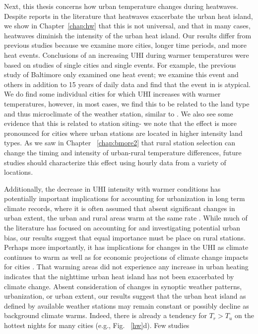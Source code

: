 Next, this thesis concerns how urban temperature changes during heatwaves. 
Despite reports in the literature that heatwaves exacerbate the urban heat island, we show in Chapter~\ref{chap:hw} that this is not universal, and that in many cases, heatwaves diminish the intensity of the urban heat island. 
Our results differ from previous studies because we examine more cities, longer time periods, and more heat events. Conclusions of an increasing UHI during warmer temperatures were based on studies of single cities and single events. For example, the previous study of Baltimore \citep{li2013synergistic} only examined one heat event; we examine this event and others in addition to 15 years of daily data and find that the event in \cite{li2013synergistic} is atypical. We do find some individual cities for which UHI increases with warmer temperatures, however, in most cases, we find this to be related to the land type and thus microclimate of the weather station, similar to \cite{zhou2010atlanta}. 
We also see some evidence that this is related to station siting- we note that the effect is more pronounced for cities where urban stations are located in higher intensity land types. As we saw in Chapter ~\ref{chap:bmore2} that rural station selection can change the timing and intensity of urban-rural temperature differences, future studies should characterize this effect using hourly data from a variety of locations. 

Additionally, the decrease in UHI intensity with warmer conditions has potentially important implications for accounting for urbanization in long term climate records, where it is often assumed that absent significant changes in urban extent, the urban and rural areas warm at the same rate \citep{hausfather2013quantifying,stone2012managing}.  While much of the literature has focused on accounting for and investigating potential urban bias, our results suggest that equal importance must be place on rural stations. 
Perhaps more importantly, it has implications for changes in the UHI as climate continues to warm as well as for economic projections of climate change impacts for cities \citep{estrada2017global}. 
That warming areas did not experience any increase in urban heating indicates that the nighttime urban heat island has not been exacerbated by climate change.  Absent consideration of changes in synoptic weather patterns, urbanization, or urban extent, our results suggest that the urban heat island as defined by available weather stations may remain constant or possibly decline as background climate warms. Indeed, there is already a tendency for $T_r > T_u$ on the hottest nights for many cities (e.g., Fig. ~\ref{hw}d). Few studies 

